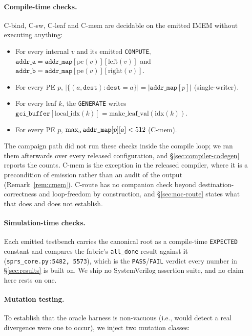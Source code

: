\documentclass[journal,10pt]{IEEEtran}
\theoremstyle{plain}
\theoremstyle{definition}
\theoremstyle{remark}
\newcommand{\sv}[1]{\texttt{#1}}
\begin{document}
\paragraph{Compile-time checks.} \textsf{C-bind}, \textsf{C-sw},
\textsf{C-leaf} and \textsf{C-mem} are decidable on the emitted IMEM without
executing anything:
\begin{itemize}
\item For every internal $v$ and its emitted \texttt{COMPUTE},
  $\texttt{addr\_a} = \texttt{addr\_map}[\text{pe}(v)][\mathrm{left}(v)]$
  and $\texttt{addr\_b} = \texttt{addr\_map}[\text{pe}(v)][\mathrm{right}(v)]$.
\item For every PE $p$, $|\{(a, \texttt{dest}) : \texttt{dest} = a\}| =
  |\texttt{addr\_map}[p]|$ (single-writer).
\item For every leaf $k$, the \texttt{GENERATE} writes
  $\texttt{gci\_buffer}[\text{local\_idx}(k)] = \mathrm{make\_leaf\_val}(\mathrm{idx}(k))$.
\item For every PE $p$, $\max_a \texttt{addr\_map}[p][a] < 512$
  (\textsf{C-mem}).
\end{itemize}
\vspace{-\topsep}
The campaign path did not run these checks inside the compile loop; we ran
them afterwards over every released configuration, and
\S\ref{sec:compiler-codegen} reports the counts. \textsf{C-mem} is the
exception in the released compiler, where it is a precondition of emission
rather than an audit of the output (Remark~\ref{rem:cmem}). \textsf{C-route} has no
companion check beyond destination-correctness and loop-freedom by
construction, and \S\ref{sec:noc-route} states what that does and does not
establish.

\paragraph{Simulation-time checks.} Each emitted testbench carries the
canonical root as a compile-time \sv{EXPECTED} constant and compares the
fabric's \sv{all\_done} result against it
(\sv{sprs\_core.py:5482,\,5573}), which is the \sv{PASS}/\sv{FAIL} verdict
every number in \S\ref{sec:results} is built on. We ship no SystemVerilog
assertion suite, and no claim here rests on one.

\paragraph{Mutation testing.} To establish that the oracle harness is
non-vacuous (i.e., would detect a real divergence were one to occur), we
inject two mutation classes:
\end{document}
